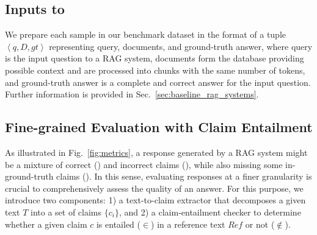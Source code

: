 \subsection{Inputs to \benchname}

We prepare each sample in our benchmark dataset in the format of a tuple $\left< q, D, gt\right>$ representing query, documents, and ground-truth answer, where query is the input question to a RAG system, documents form the database providing possible context and are processed into chunks with the same number of tokens, and ground-truth answer is a complete and correct answer for the input question. Further information is provided in Sec.~\ref{sec:baseline_rag_systems}.

\subsection{Fine-grained Evaluation with Claim Entailment}

As illustrated in Fig.~\ref{fig:metrics}, a response generated by a RAG system might be a mixture of correct (\hollowcircle) and incorrect claims (\crossmark), while also missing some in-ground-truth claims (\hollowtriangle). In this sense, evaluating responses at a finer granularity is crucial to comprehensively assess the quality of an answer. For this purpose, we introduce two components: 1) a text-to-claim extractor that decomposes a given text $T$ into a set of claims $\{c_i\}$, and 2) a claim-entailment checker to determine whether a given claim $c$ is entailed ($\in$) in a reference text $Ref$ or not ($\notin$).%


